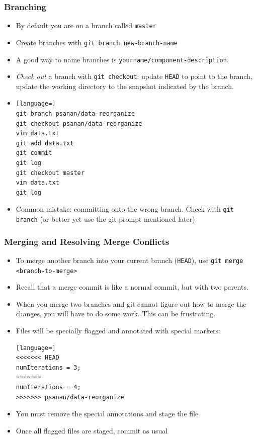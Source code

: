 \documentclass{beamer}
\begin{document}
\begin{frame}[fragile]
\frametitle{Branching}
\begin{itemize}
\item By default you are on a branch called \texttt{master}
\item Create branches with \lstinline{git branch new-branch-name}
\item A good way to name branches is \lstinline{yourname/component-description}.
\item \emph{Check out} a branch with \lstinline{git checkout}: update \texttt{HEAD} to point to the branch, update the working directory to the snapshot indicated by the branch.
\item
\begin{lstlisting}[language=]
git branch psanan/data-reorganize
git checkout psanan/data-reorganize
vim data.txt
git add data.txt
git commit
git log
git checkout master
vim data.txt
git log
\end{lstlisting}
\item Common mistake: committing onto the wrong branch. Check with \lstinline{git branch} (or better yet use the git prompt mentioned later)
\end{itemize}
\end{frame}

\begin{frame}[fragile]
\frametitle{Merging and Resolving Merge Conflicts}
\begin{itemize}
\item To merge another branch into your current branch (\texttt{HEAD}), use \lstinline{git merge <branch-to-merge>}
\item Recall that a merge commit is like a normal commit, but with two parents.
\item When you merge two branches and git cannot figure out how to merge the changes, you will have to do some work. This can be frustrating.
\item Files will be specially flagged and annotated with special markers:
\begin{lstlisting}[language=]
<<<<<<< HEAD
numIterations = 3;
=======
numIterations = 4;
>>>>>>> psanan/data-reorganize
\end{lstlisting}
\item You must remove the special annotations and stage the file
\item Once all flagged files are staged, commit as usual
\end{itemize}
\end{frame}
\end{document}
